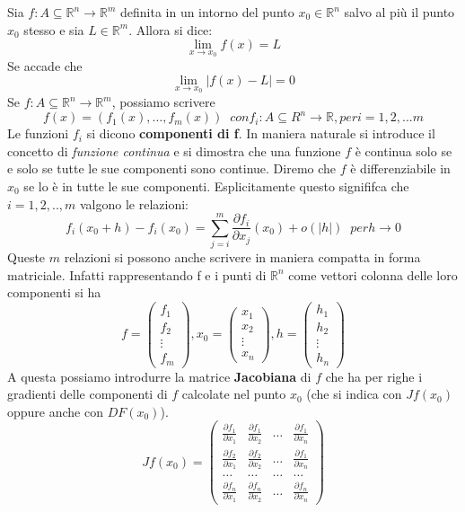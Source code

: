 \documentclass[a4paper]{article}
\numberwithin{equation}{subsection}
\begin{document}
\dfn{}
{
    Sia $f : A \subseteq \mathbb{R}^n \rightarrow \mathbb{R}^m$ definita in un intorno del punto $x_0 \in \mathbb{R}^n$
    salvo al più il punto $x_0$ stesso e sia $L \in \mathbb{R}^m$. Allora si dice: 
    \[\lim_{x \rightarrow x_0} f(x) = L\]
    Se accade che 
    \[\lim_{x \rightarrow x_0} |f(x) - L| = 0\]
    Se $f : A \subseteq \mathbb{R}^n \rightarrow \mathbb{R}^m$, possiamo scrivere
    \[f(x) = (f_1(x), \dots, f_m(x)) \; \; con f_i : A \subseteq{R}^n \rightarrow \mathbb{R}, per i = 1,2,...m\]
    Le funzioni $f_i$ si dicono \textbf{componenti di f}.
}
In maniera naturale si introduce il concetto di \textit{funzione continua} e si dimostra che una funzione $f$ è continua 
solo se e solo se tutte le sue componenti sono continue.
\dfn{}
{
    Diremo che $f$ è differenziabile in $x_0$ se lo è in tutte le sue componenti.
    Esplicitamente questo signififca che $i = 1,2,..,m$ valgono le relazioni: 
    \[f_i(x_0 + h) - f_i(x_0) = \sum_{j = i}^{m} \frac{\partial f_i}{\partial x_j}(x_0) + o(|h|) \; \; per h \rightarrow 0 \] 
}
\noindent
Queste $m$ relazioni si possono anche scrivere in maniera compatta in forma matriciale. Infatti
rappresentando f e i punti di $\mathbb{R}^n$ come vettori colonna delle loro componenti si ha 
\[f = \begin{pmatrix}
    f_1\\f_2\\\vdots\\f_m
\end{pmatrix}, x_0 = \begin{pmatrix}
    x_1\\x_2\\\vdots\\x_n
\end{pmatrix}, h = \begin{pmatrix}
    h_1\\h_2\\\vdots\\h_n
\end{pmatrix}\]
A questa possiamo introdurre la matrice \textbf{Jacobiana} di $f$ che ha per righe i gradienti
delle componenti di $f$ calcolate nel punto $x_0$  (che si indica con $Jf(x_0)$ oppure anche con $DF(x_0)$).
\[Jf(x_0) = \begin{pmatrix}
    \frac{\partial f_1}{\partial x_1} & \frac{\partial f_1}{\partial x_2} & \dots & \frac{\partial f_1}{\partial x_n}\\
    \frac{\partial f_2}{\partial x_1} & \frac{\partial f_2}{\partial x_2} & \dots & \frac{\partial f_1}{\partial x_n}\\
    \dots &\dots & \dots & \dots\\
    \frac{\partial f_n}{\partial x_1} & \frac{\partial f_n}{\partial x_2} & \dots & \frac{\partial f_n}{\partial x_n}
\end{pmatrix}\]
\end{document}
